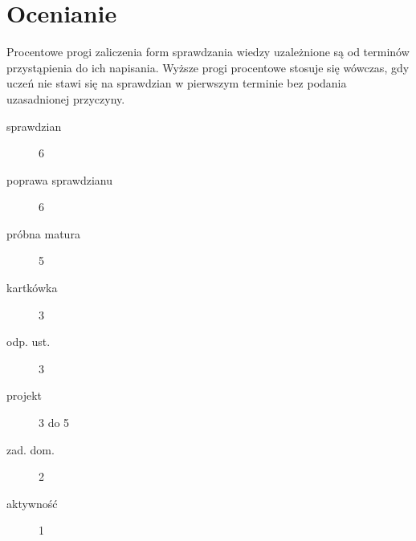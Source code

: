\documentclass{article}
\begin{document}
\section{Ocenianie}
Procentowe progi zaliczenia form sprawdzania wiedzy uzależnione są od terminów
przystąpienia do ich napisania. Wyższe progi procentowe stosuje się wówczas,
gdy uczeń nie stawi się na sprawdzian w pierwszym terminie bez podania uzasadnionej przyczyny.
\begin{table}[]
    \centering
    \end{table}
\begin{description}
    \item[sprawdzian] 6
    \item[poprawa sprawdzianu] 6
    \item[próbna matura] 5
    \item[kartkówka] 3
    \item[odp. ust.] 3
    \item[projekt] 3 do 5
    \item[zad. dom.] 2
    \item[aktywność] 1
\end{description}
\end{document}
